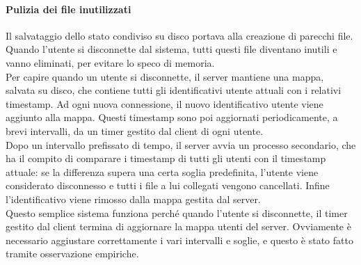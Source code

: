\paragraph{Pulizia dei file inutilizzati}
Il salvataggio dello stato condiviso su disco portava alla creazione di parecchi file. Quando l'utente si disconnette dal sistema, tutti questi file diventano inutili e vanno eliminati, per evitare lo speco di memoria.
\\
Per capire quando un utente si disconnette, il server mantiene una mappa, salvata su disco, che contiene tutti gli identificativi utente attuali con i relativi timestamp. Ad ogni nuova connessione, il nuovo identificativo utente viene aggiunto alla mappa. Questi timestamp sono poi aggiornati periodicamente, a brevi intervalli, da un timer gestito dal client di ogni utente.
\\ 
Dopo un intervallo prefissato di tempo, il server avvia un processo secondario, che ha il compito di comparare i timestamp di tutti gli utenti con il timestamp attuale: se la differenza supera una certa soglia predefinita, l'utente viene considerato disconnesso e tutti i file a lui collegati vengono cancellati. Infine l'identificativo viene rimosso dalla mappa gestita dal server.
\\
Questo semplice sistema funziona perché quando l'utente si disconnette, il timer gestito dal client termina di aggiornare la mappa utenti del server. Ovviamente è necessario aggiustare correttamente i vari intervalli e soglie, e questo è stato fatto tramite osservazione empiriche.


